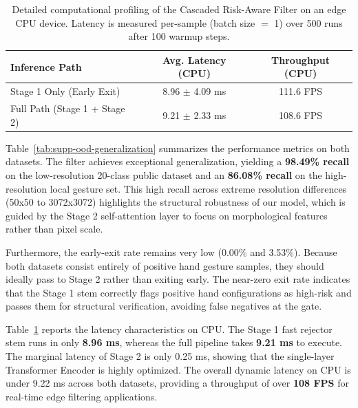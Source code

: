 \documentclass{bmvc2k}
\begin{document}
\begin{table}[H]
\centering
\footnotesize
\vspace{2mm}
\begin{tabular}{@{}l c c@{}}
\hline
\textbf{Inference Path} & \textbf{Avg. Latency (CPU)} & \textbf{Throughput (CPU)} \\
\hline
Stage 1 Only (Early Exit) & 8.96 $\pm$ 4.09 ms & 111.6 FPS \\
Full Path (Stage 1 + Stage 2) & 9.21 $\pm$ 2.33 ms & 108.6 FPS \\
\hline
\end{tabular}
\vspace{3mm}
\caption{Detailed computational profiling of the Cascaded Risk-Aware Filter on an edge CPU device. Latency is measured per-sample (batch size $=$ 1) over 500 runs after 100 warmup steps.}
\label{tab:supp-latency-profiling}
\end{table}

Table~\ref{tab:supp-ood-generalization} summarizes the performance metrics on both datasets. The filter achieves exceptional generalization, yielding a \textbf{98.49\% recall} on the low-resolution 20-class public dataset and an \textbf{86.08\% recall} on the high-resolution local gesture set. This high recall across extreme resolution differences (50x50 to 3072x3072) highlights the structural robustness of our model, which is guided by the Stage 2 self-attention layer to focus on morphological features rather than pixel scale.

Furthermore, the early-exit rate remains very low (0.00\% and 3.53\%). Because both datasets consist entirely of positive hand gesture samples, they should ideally pass to Stage 2 rather than exiting early. The near-zero exit rate indicates that the Stage 1 stem correctly flags positive hand configurations as high-risk and passes them for structural verification, avoiding false negatives at the gate.

Table~\ref{tab:supp-latency-profiling} reports the latency characteristics on CPU. The Stage 1 fast rejector stem runs in only \textbf{8.96 ms}, whereas the full pipeline takes \textbf{9.21 ms} to execute. The marginal latency of Stage 2 is only 0.25 ms, showing that the single-layer Transformer Encoder is highly optimized. The overall dynamic latency on CPU is under 9.22 ms across both datasets, providing a throughput of over \textbf{108 FPS} for real-time edge filtering applications.

\end{document}
